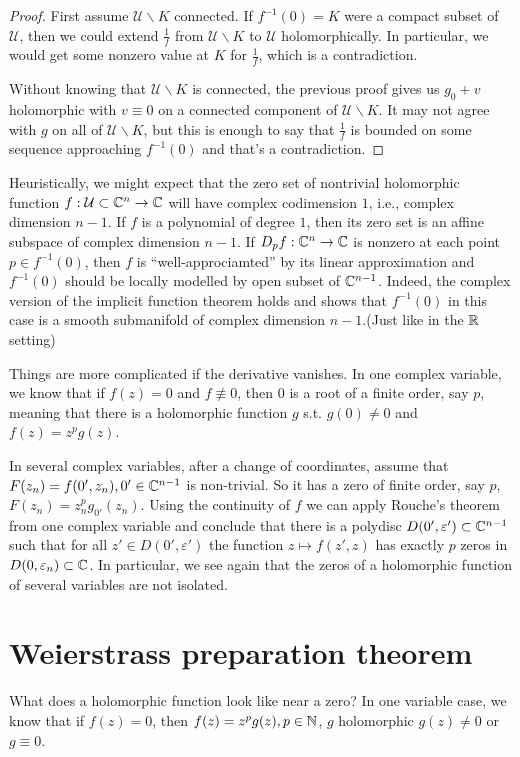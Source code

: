\begin{proof}
  First assume $\mathcal{U}\backslash K$ connected. If $f^{-1}(0)=K$ were a compact subset of $\mathcal{U}$, then we could extend $\frac{1}{f}$ from $\mathcal{U} \backslash K$ to $\mathcal{U}$ holomorphically. In particular, we would get some nonzero value at  $K$ for $\frac{1}{f}$, which is a contradiction. 

  Without knowing that $\mathcal{U}\backslash K$ is connected, the previous proof gives us $g_0+v$ holomorphic with $v\equiv 0$ on a connected component of $\mathcal{U}\backslash K$. It may not agree with $g$ on all of $\mathcal{U}\backslash K$, but this is enough to say that $\frac{1}{f}$ is bounded on some sequence approaching $f^{-1}(0)$ and that's a contradiction.
\end{proof}

Heuristically, we might expect that the zero set of nontrivial holomorphic function  $f:\mathcal{U}\subset \mathbb{C}^{n}\to \mathbb{C}$ will have complex codimension $1$, i.e., complex dimension $n-1$. If $f$ is a polynomial of degree  $1$, then its zero set is an affine subspace of complex dimension $n-1$. If $D_p f:\mathbb{C}^{n}\to \mathbb{C}$ is nonzero at each point $p\in f^{-1}(0)$, then $f$ is ``well-approciamted'' by its linear approximation and $f^{-1}(0)$ should be locally modelled by open subset of $\mathbb{C}^{n-1}$. Indeed, the complex version of the implicit function theorem holds and shows that $f^{-1}(0)$ in this case is a smooth submanifold of complex dimension $n-1$.(Just like in the $\mathbb{R}$ setting)

Things are more complicated if the derivative vanishes. In one complex variable, we know that if  $f(z)=0$ and $f\not\equiv 0$, then $0$ is a root of a finite order, say $p$, meaning that there is a holomorphic function $g$ s.t. $g(0)\neq 0$ and $f(z)=z^{p}g(z)$.

In several complex variables, after a change of coordinates, assume that $F(z_n)=f(0',z_n),0' \in \mathbb{C}^{n-1}$ is non-trivial. So it has a zero of finite order, say $p$, $F(z_n)=z_n^{p}g_{0'}(z_n)$. Using the continuity of $f$ we can apply Rouche's theorem from one complex variable and conclude that there is a polydisc  $D(0',\varepsilon ') \subset \mathbb{C}^{n-1}$ such that for all $z' \in D(0',\varepsilon ')$ the function $z\mapsto f(z',z)$ has exactly $p$ zeros in $D(0,\varepsilon _n)\subset \mathbb{C}$. In particular, we see again that the zeros of a holomorphic function of several variables are not isolated.

\section{Weierstrass preparation theorem}
What does a holomorphic function look like near a zero? In one variable case, we know that if $f(z)=0$, then $f(z)=z^{p}g(z),p \in  \mathbb{N}$, $g$ holomorphic $g(z)\neq 0$ or $g\equiv 0$.


